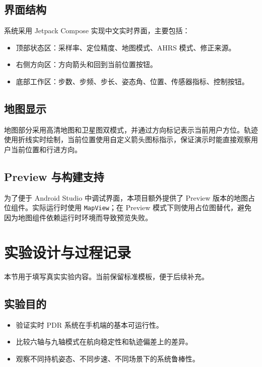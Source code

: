 \documentclass[12pt,a4paper]{ctexart}
\begin{document}
\subsection{界面结构}
系统采用 Jetpack Compose 实现中文实时界面，主要包括：

\begin{itemize}
    \item 顶部状态区：采样率、定位精度、地图模式、AHRS 模式、修正来源。
    \item 右侧方向区：方向箭头和回到当前位置按钮。
    \item 底部工作区：步数、步频、步长、姿态角、位置、传感器指标、控制按钮。
\end{itemize}

\subsection{地图显示}
地图部分采用高清地图和卫星图双模式，并通过方向标记表示当前用户方位。轨迹使用折线实时绘制，当前位置使用自定义箭头图标指示，保证演示时能直接观察用户当前位置和行进方向。

\subsection{Preview 与构建支持}
为了便于 Android Studio 中调试界面，本项目额外提供了 Preview 版本的地图占位组件。实际运行时使用 \texttt{MapView}；在 Preview 模式下则使用占位图替代，避免因为地图组件依赖运行时环境而导致预览失败。

\section{实验设计与过程记录}
本节用于填写真实实验内容。当前保留标准模板，便于后续补充。

\subsection{实验目的}
\begin{itemize}
    \item 验证实时 PDR 系统在手机端的基本可运行性。
    \item 比较六轴与九轴模式在航向稳定性和轨迹偏差上的差异。
    \item 观察不同持机姿态、不同步速、不同场景下的系统鲁棒性。
\end{itemize}
\end{document}
